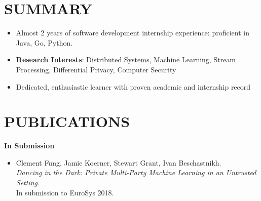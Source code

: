 \documentclass[10pt]{res} %
\begin{document}
\begin{resume}


\section{SUMMARY}

\vspace{0.2in} %

\begin{itemize}
    \item Almost 2 years of software development internship experience:
    proficient in Java, Go, Python.
    \item \textbf{Research Interests}: Distributed Systems, Machine
    Learning, Stream Processing, Differential Privacy, Computer Security
    \item Dedicated, enthusiastic learner with proven academic and internship record
\end{itemize}


\section{PUBLICATIONS}

\vspace{0.2in} %

\textbf{In Submission} 
\begin{itemize}
\item Clement Fung, Jamie Koerner, Stewart Grant, Ivan Beschastnikh.
\\
\emph{Dancing in the Dark: Private Multi-Party Machine Learning in an
Untrusted Setting.} \\ 
In submission to EuroSys 2018.
\end{itemize}



\end{resume}
\end{document}
